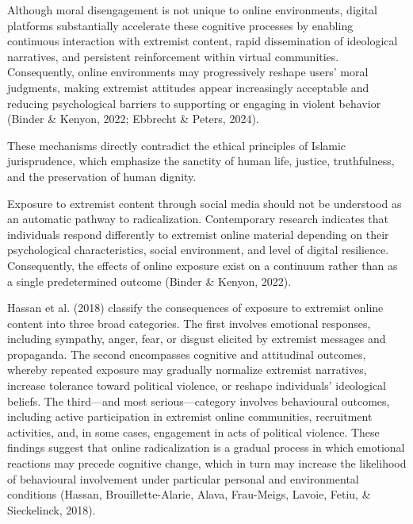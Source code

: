 \documentclass[10pt]{NSP1}
\begin{document}
Although moral disengagement is not unique to online environments, digital platforms substantially accelerate these cognitive processes by enabling continuous interaction with extremist content, rapid dissemination of ideological narratives, and persistent reinforcement within virtual communities. Consequently, online environments may progressively reshape users' moral judgments, making extremist attitudes appear increasingly acceptable and reducing psychological barriers to supporting or engaging in violent behavior (Binder \& Kenyon, 2022; Ebbrecht \& Peters, 2024).

These mechanisms directly contradict the ethical principles of Islamic jurisprudence, which emphasize the sanctity of human life, justice, truthfulness, and the preservation of human dignity.

\par\medskip{}\smallskip

Exposure to extremist content through social media should not be understood as an automatic pathway to radicalization. Contemporary research indicates that individuals respond differently to extremist online material depending on their psychological characteristics, social environment, and level of digital resilience. Consequently, the effects of online exposure exist on a continuum rather than as a single predetermined outcome (Binder \& Kenyon, 2022).

Hassan et al. (2018) classify the consequences of exposure to extremist online content into three broad categories. The first involves emotional responses, including sympathy, anger, fear, or disgust elicited by extremist messages and propaganda. The second encompasses cognitive and attitudinal outcomes, whereby repeated exposure may gradually normalize extremist narratives, increase tolerance toward political violence, or reshape individuals' ideological beliefs. The third—and most serious—category involves behavioural outcomes, including active participation in extremist online communities, recruitment activities, and, in some cases, engagement in acts of political violence. These findings suggest that online radicalization is a gradual process in which emotional reactions may precede cognitive change, which in turn may increase the likelihood of behavioural involvement under particular personal and environmental conditions (Hassan, Brouillette-Alarie, Alava, Frau-Meigs, Lavoie, Fetiu, \& Sieckelinck, 2018).
\end{document}
